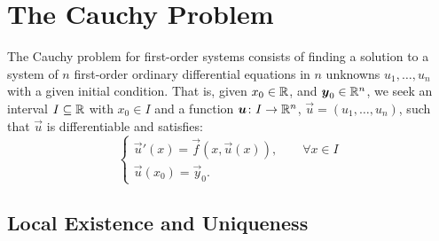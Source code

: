 \section{The Cauchy Problem}

The Cauchy problem for first-order systems consists of finding a solution to a
system of $n$ first-order ordinary differential equations in $n$ unknowns $u_1,
\dots, u_n$ with a given initial condition. That is, given $x_0\in {\mathbb R}$, and
$\boldsymbol y_0 \in {\mathbb R}^n$, we seek an interval $I\subseteq {\mathbb R}$ with $x_0\in I$ and a
function $\boldsymbol u \colon I\to {\mathbb R}^n$, $\vec u = (u_1, \dots, u_n)$, such that
$\vec u$ is differentiable and satisfies:
\begin{equation}\label{eq:problema_cauchy}
\begin{cases}
 \vec u'(x) = \vec f(x, \vec u(x)), \qquad \forall x\in I\\
 \vec u(x_0) = \vec y_0.
\end{cases}
\end{equation}

\subsection{Local Existence and Uniqueness}

